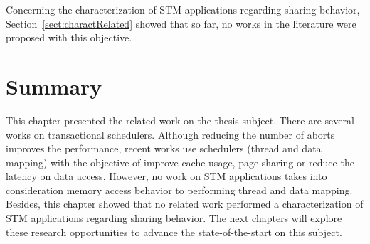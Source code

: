 Concerning the characterization of STM applications regarding sharing behavior, Section~\ref{sect:charactRelated} showed that so far, no works in the literature were proposed with this objective.


\section{Summary}
This chapter presented the related work on the thesis subject. There are several works on transactional schedulers. Although reducing the number of aborts improves the performance, recent works use schedulers (thread and data mapping) with the objective of improve cache usage, page sharing or reduce the latency on data access. However, no work on STM applications takes into consideration memory access behavior to performing thread and data mapping. Besides, this chapter showed that no related work performed a characterization of STM applications regarding sharing behavior. The next chapters will explore these research opportunities to advance the state-of-the-start on this subject.
